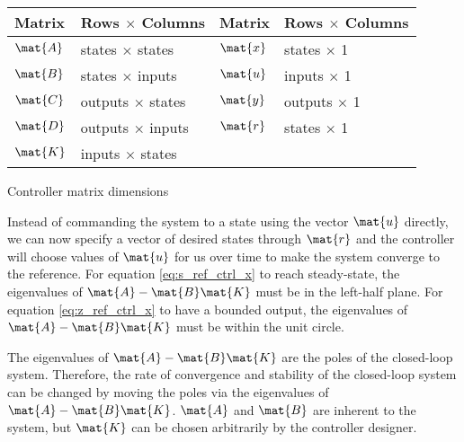 \begin{booktable}
  \begin{tabular}{|ll|ll|}
    \hline
    \rowcolor{headingbg}
    \textbf{Matrix} & \textbf{Rows $\times$ Columns} &
    \textbf{Matrix} & \textbf{Rows $\times$ Columns} \\
    \hline
    $\mat{A}$ & states $\times$ states & $\mat{x}$ & states $\times$ 1 \\
    $\mat{B}$ & states $\times$ inputs & $\mat{u}$ & inputs $\times$ 1 \\
    $\mat{C}$ & outputs $\times$ states & $\mat{y}$ & outputs $\times$ 1 \\
    $\mat{D}$ & outputs $\times$ inputs & $\mat{r}$ & states $\times$ 1 \\
    $\mat{K}$ & inputs $\times$ states &  &  \\
    \hline
  \end{tabular}
  \caption{Controller matrix dimensions}
\end{booktable}

Instead of commanding the \gls{system} to a \gls{state} using the vector
$\mat{u}$ directly, we can now specify a vector of desired \glspl{state} through
$\mat{r}$ and the \gls{controller} will choose values of $\mat{u}$ for us over
time to make the \gls{system} converge to the \gls{reference}. For equation
\eqref{eq:s_ref_ctrl_x} to reach steady-state, the eigenvalues of
$\mat{A} - \mat{B}\mat{K}$ must be in the left-half plane. For equation
\eqref{eq:z_ref_ctrl_x} to have a bounded output, the eigenvalues of
$\mat{A} - \mat{B}\mat{K}$ must be within the unit circle.

The eigenvalues of $\mat{A} - \mat{B}\mat{K}$ are the poles of the closed-loop
\gls{system}. Therefore, the rate of convergence and stability of the
closed-loop \gls{system} can be changed by moving the poles via the eigenvalues
of $\mat{A} - \mat{B}\mat{K}$. $\mat{A}$ and $\mat{B}$ are inherent to the
\gls{system}, but $\mat{K}$ can be chosen arbitrarily by the controller
designer.
